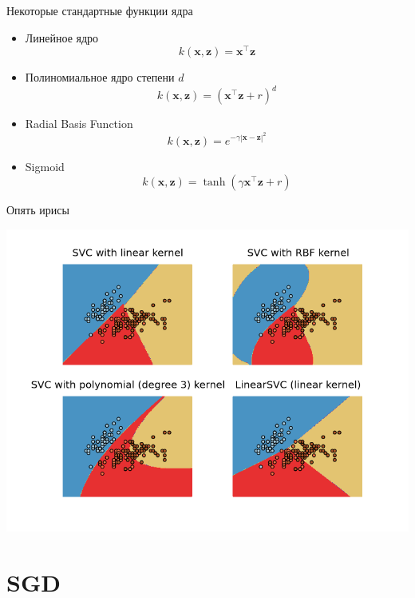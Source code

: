\documentclass[10pt]{beamer}
\begin{document}
\begin{frame}{Некоторые стандартные функции ядра}

\begin{itemize}
\item Линейное ядро
\[
k(\mathbf{x}, \mathbf{z}) = \mathbf{x}^\top\mathbf{z}
\]
\item Полиномиальное ядро степени $d$
\[
k(\mathbf{x}, \mathbf{z}) = (\mathbf{x}^\top\mathbf{z} + r)^d
\]
\item Radial Basis Function
\[
k(\mathbf{x}, \mathbf{z}) = e^{-\gamma |\mathbf x - \mathbf z|^2}
\]
\item Sigmoid
\[
k(\mathbf{x}, \mathbf{z}) = \tanh (\gamma \mathbf{x}^\top\mathbf{z} + r)
\]

\end{itemize}

\end{frame}

\begin{frame}{Опять ирисы}

\begin{center}
\includegraphics[scale=0.5]{images/iris.png}
\end{center}

\end{frame}


\section{SGD}

\end{document}
